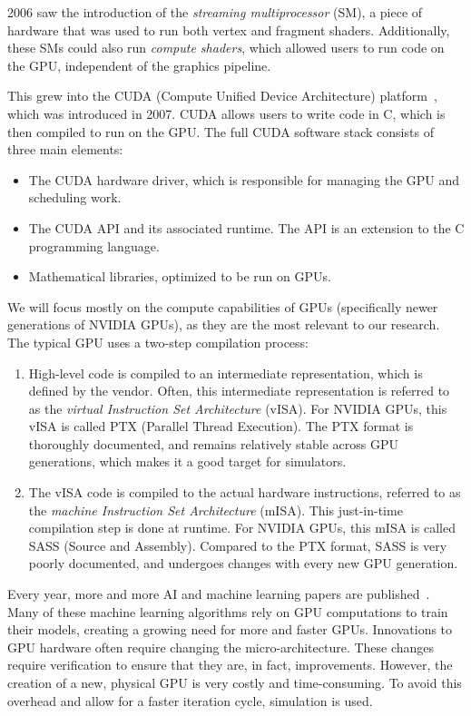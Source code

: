 2006 saw the introduction of the \textit{streaming multiprocessor} (SM), a piece of hardware that was used to run both vertex and fragment shaders.
Additionally, these SMs could also run \textit{compute shaders}, which allowed users to run code on the GPU, independent of the graphics pipeline.

This grew into the CUDA (Compute Unified Device Architecture) platform~\cite{cuda, cuda-prog}, which was introduced in 2007.
CUDA allows users to write code in C, which is then compiled to run on the GPU\@.
The full CUDA software stack consists of three main elements:
\begin{itemize}
    \item The CUDA hardware driver, which is responsible for managing the GPU and scheduling work.
    \item The CUDA API and its associated runtime.
    The API is an extension to the C programming language.
    \item Mathematical libraries, optimized to be run on GPUs.
\end{itemize}

We will focus mostly on the compute capabilities of GPUs (specifically newer generations of NVIDIA GPUs), as they are the most relevant to our research.
The typical GPU uses a two-step compilation process:
\begin{enumerate}
    \item High-level code is compiled to an intermediate representation, which is defined by the vendor.
    Often, this intermediate representation is referred to as the \textit{virtual Instruction Set Architecture} (vISA).
    For NVIDIA GPUs, this vISA is called PTX (Parallel Thread Execution).
    The PTX format is thoroughly documented, and remains relatively stable across GPU generations, which makes it a good target for simulators.
    \item The vISA code is compiled to the actual hardware instructions, referred to as the \textit{machine Instruction Set Architecture} (mISA).
    This just-in-time compilation step is done at runtime.
    For NVIDIA GPUs, this mISA is called SASS (Source and Assembly).
    Compared to the PTX format, SASS is very poorly documented, and undergoes changes with every new GPU generation.
\end{enumerate}

Every year, more and more AI and machine learning papers are published~\cite{aiindex}.
Many of these machine learning algorithms rely on GPU computations to train their models, creating a growing need for more and faster GPUs.
Innovations to GPU hardware often require changing the micro-architecture.
These changes require verification to ensure that they are, in fact, improvements.
However, the creation of a new, physical GPU is very costly and time-consuming.
To avoid this overhead and allow for a faster iteration cycle, simulation is used.


